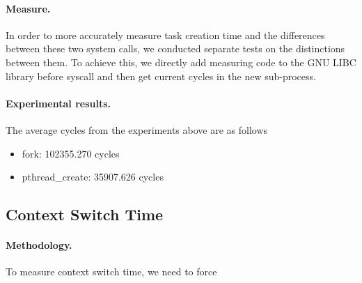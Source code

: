 \paragraph{Measure.} In order to more accurately measure task creation time and the differences between these two system calls, we conducted separate tests on the distinctions between them. To achieve this, we directly add measuring code to the GNU LIBC library before syscall and then get current cycles in the new sub-process. 
\paragraph{Experimental results.}
The average cycles from the experiments above are as follows
\begin{itemize}[leftmargin=*]
	\item fork: 102355.270 cycles
	\item pthread\_create: 35907.626 cycles
\end{itemize}

\subsection{Context Switch Time}
\paragraph{Methodology.} To measure context switch time, we need to force 